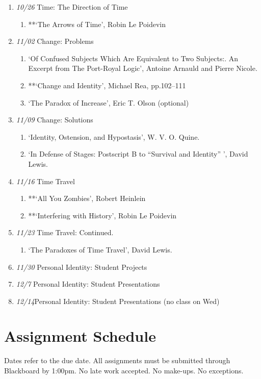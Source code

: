 \documentclass[11pt,article,oneside]{memoir}
\begin{document}
\begin{enumerate}
\item \textit{10/26} Time: The Direction of Time
\begin{enumerate}
\item **`The Arrows of Time', Robin Le Poidevin 
\end{enumerate}

\item \textit{11/02} Change: Problems
\begin{enumerate}
\item `Of Confused Subjects Which Are Equivalent to Two Subjects:. An Excerpt from The Port-Royal Logic', Antoine Arnauld and Pierre Nicole. 
\item **`Change and Identity', Michael Rea, pp.102--111 
\item `The Paradox of Increase', Eric T. Olson (optional)
\end{enumerate}
\item \textit{11/09} Change: Solutions
\begin{enumerate}
 \item `Identity, Ostension, and Hypostasis', W. V. O. Quine.
\item `In Defense of Stages: Postscript B to ``Survival and Identity'' ', David Lewis.
\end{enumerate}
\item \textit{11/16} Time Travel
\begin{enumerate}
\item **`All You Zombies', Robert Heinlein 
\item **`Interfering with History', Robin Le Poidevin 
\end{enumerate}
\item \textit{11/23} Time Travel: Continued.
\begin{enumerate}
\item `The Paradoxes of Time Travel', David Lewis.
\end{enumerate}
\item \textit{11/30} Personal Identity: Student Projects
\item \textit{12/7}  Personal Identity: Student Presentations
\item \textit{12/14}Personal Identity: Student Presentations (no class on Wed)
\end{enumerate}

\section{ Assignment Schedule}
Dates refer to the due date. All assignments must be submitted through Blackboard by 1:00pm. No late work accepted. No make-ups. No exceptions. 
\end{document}
